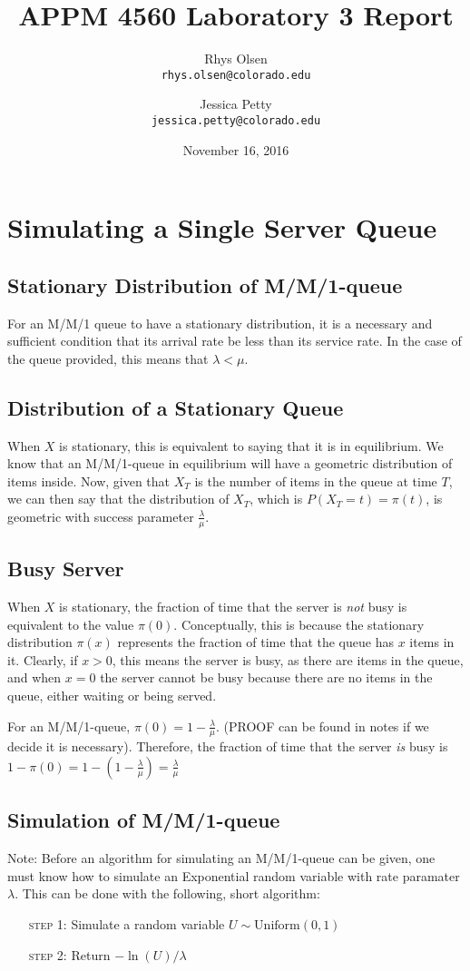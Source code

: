 \documentclass[11pt, oneside]{article}
\title{APPM 4560 Laboratory 3 Report}
\author{Rhys Olsen\\
\texttt{rhys.olsen@colorado.edu}
 \and Jessica Petty\\
 \texttt{jessica.petty@colorado.edu}
 }
\date{November 16, 2016}
\begin{document}
\maketitle
\section{Simulating a Single Server Queue}
\subsection{Stationary Distribution of M/M/1-queue}
For an M/M/1 queue to have a stationary distribution, it is a necessary and sufficient condition that its arrival rate be less than its service rate. In the case of the queue provided, this means that $\lambda < \mu$.

\subsection{Distribution of a Stationary Queue}
When $X$ is stationary, this is equivalent to saying that it is in equilibrium. We know that an M/M/1-queue in equilibrium will have a geometric distribution of items inside. Now, given that $X_T$ is the number of items in the queue at time $T$, we can then say that the distribution of $X_T$, which is $P(X_T = t) = \pi(t)$, is geometric with success parameter $\frac{\lambda}{\mu}$.

\subsection{Busy Server}
When $X$ is stationary, the fraction of time that the server is \textit{not} busy is equivalent to the value $\pi(0)$. Conceptually, this is because the stationary distribution $\pi(x)$ represents the fraction of time that the queue has $x$ items in it. Clearly, if $x > 0$, this means the server is busy, as there are items in the queue, and when $x=0$ the server cannot be busy because there are no items in the queue, either waiting or being served.

For an M/M/1-queue, $\pi(0)=1-\frac{\lambda}{\mu}$. (PROOF can be found in notes if we decide it is necessary). Therefore, the fraction of time that the server \textit{is} busy is $1-\pi(0)=1-(1-\frac{\lambda}{\mu})=\frac{\lambda}{\mu}$

\subsection{Simulation of M/M/1-queue}
Note: Before an algorithm for simulating an M/M/1-queue can be given, one must know how to simulate an Exponential random variable with rate paramater $\lambda$. This can be done with the following, short algorithm:
\begin{enumerate}[leftmargin=30pt,labelindent=65pt,itemindent=30pt]
\item[\textsc{step 1:}] Simulate a random variable $U \sim \text{Uniform}(0,1)$
\item[\textsc{step 2:}] Return $-\ln(U)/\lambda$
\end{enumerate}
\end{document}

